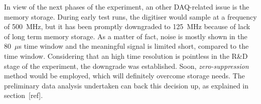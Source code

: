  In view of the next phases of the experiment, an other DAQ-related issue is the memory storage.
 During early test runs, the digitiser would sample at a frequency of 500~MHz, but it has been %
 promptly downgraded to 125~MHz because of lack of long term memory storage.
 As a matter of fact, noise is mostly shown in the 80~$\mu$s time window and %
 the meaningful signal is limited short, compared to the time window.
 Considering that an high time resolution is pointless in the R\&D stage of the experiment, the %
 downgrade was established.
 Soon, \emph{zero-suppression} method would be employed, which will definitely overcome storage needs.
 The preliminary data analysis undertaken can back this decision up, as explained in section~[ref].
